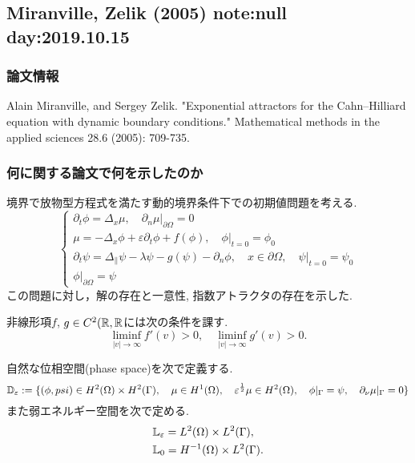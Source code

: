 \documentclass[a4paper]{article}
\begin{document}
\newpage

\subsection{Miranville, Zelik (2005) \cite{MiranvilleZelik2005} note:null  day:2019.10.15}
	\subsubsection{論文情報}
		Alain Miranville, and Sergey Zelik. "Exponential attractors for the Cahn–Hilliard equation with dynamic boundary conditions." Mathematical methods in the applied sciences 28.6 (2005): 709-735.
	\subsubsection{何に関する論文で何を示したのか}
		境界で放物型方程式を満たす動的境界条件下での初期値問題を考える.
		\begin{equation}\left\{\begin{array}{l}
			{\partial_{t} \phi=\Delta_{x} \mu,\left.\quad \partial_{n} \mu\right|_{\partial \Omega}=0} \\ {\mu=-\Delta_{x} \phi+\varepsilon \partial_{t} \phi+f(\phi),\left.\quad \phi\right|_{t=0}=\phi_{0}} \\ {\partial_{t} \psi=\Delta_{\|} \psi-\lambda \psi-g(\psi)-\partial_{n} \phi, \quad x \in \partial \Omega,\left.\quad \psi\right|_{t=0}=\psi_{0}} \\ {\left.\phi\right|_{\partial \Omega}=\psi}
		\end{array}\right.\end{equation}
		この問題に対し，解の存在と一意性, 指数アトラクタの存在を示した.

		非線形項$f$, $g\in C^2(\mathbb{R},\mathbb{R}$には次の条件を課す.
		\begin{equation}
			\liminf_{|v|\to\infty}f'(v)>0,\quad \liminf_{|v|\to\infty}g'(v)>0.
		\end{equation}

		自然な位相空間(phase space)を次で定義する.
		\begin{equation}
			\mathbb{D}_{\varepsilon} := \{(\phi,psi)\in H^2(\Omega)\times H^2(\Gamma),\quad \mu\in H^1(\Omega),\quad \varepsilon^{\frac{1}{2}}\mu\in H^2(\Omega),\quad \phi|_{\Gamma}=\psi,\quad \partial_{\nu}\mu|_{\Gamma}=0\}
		\end{equation}
		また弱エネルギー空間を次で定める.
		\begin{align}
			&\mathbb{L}_{\varepsilon} = L^2(\Omega)\times L^2(\Gamma),\\
			&\mathbb{L}_0 = H^{-1}(\Omega)\times L^2(\Gamma).
		\end{align}
\end{document}
